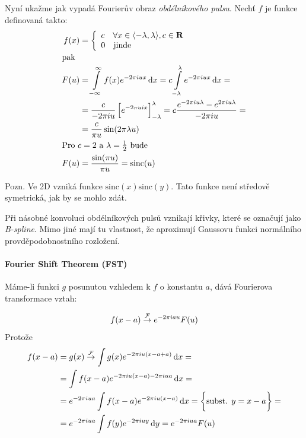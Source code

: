 Nyní ukažme jak vypadá Fourierův obraz \emph{obdélníkového pulsu}. Nechť $f$ je funkce definovaná takto:
\begin{align}
f(x) &= \left\{\begin{array}{ll}c\quad\forall x\in\langle-\lambda,\lambda\rangle,c\in \R\\
0\quad\hbox{jinde}\end{array}\right.\\
\noalign{\hbox{pak}\nonumber}
F(u) &= \int\limits_{-\infty}^{\infty}f(x)e^{-2\pi iux}\dif x=c\int\limits_{-\lambda}^\lambda e^{-2\pi i u x}\dif x=\nonumber\\
 &= \frac{c}{-2\pi i u}\left[e^{-2\pi uix}\right]_{-\lambda}^\lambda=c\frac{e^{-2\pi iu\lambda}-e^{2\pi iu\lambda}}{-2\pi i u}=\nonumber\\
 &= \frac{c}{\pi u}\sin(2\pi\lambda u)\\
\noalign{\hbox{Pro $c=2$ a $\lambda=\frac{1}{2}$ bude\nonumber}}
F(u) &= \frac{\sin(\pi u)}{\pi u}=\mathrm{sinc}(u)
\end{align}

Pozn. Ve 2D vzniká funkce $\mathrm{sinc}(x)\mathrm{sinc}(y)$. Tato funkce není středově symetrická, jak by se mohlo zdát.


Při násobné konvoluci obdélníkových pulsů vznikají křivky, které se označují jako \emph{B-spline}. Mimo jiné mají tu
vlastnost, že aproximují Gaussovu funkci normálního provděpodobnostního rozložení.


\paragraph{Fourier Shift Theorem (FST)} Máme-li funkci $g$ posunutou vzhledem k $f$ o konstantu $a$, dává Fourierova transformace vztah:

\begin{equation}
f(x-a)\stackrel{\operatorname{\mathcal{F}}}{\rightarrow} e^{-2\pi i a u} F(u)
\end{equation}
Protože
\begin{align}
f(x-a) &= g(x)\stackrel{\CFT}{\rightarrow}\int g(x)e^{-2\pi i u (x-a+a)}\dif x=\nonumber\\
 &= \int f(x-a)e^{-2\pi i u (x-a)-2\pi i u a}\dif x=\nonumber\\
 &= e^{-2\pi i u a}\int f(x-a)e^{-2\pi i u (x-a)}\dif x=\bigg\{\hbox{subst. $y=x-a$}\bigg\}=\nonumber\\
 &= e^{-2\pi i u a}\int f(y)e^{-2\pi i u y}\dif y=e^{-2\pi i u a}F(u)
\end{align}



